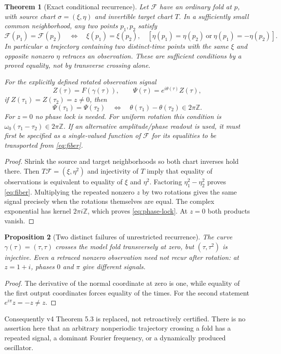 \documentclass[11pt,a4paper]{article}
\newtheorem{theorem}{Theorem}[section]
\newtheorem{proposition}[theorem]{Proposition}
\theoremstyle{definition}\newtheorem{definition}[theorem]{Definition}
\theoremstyle{remark}\newtheorem{remark}[theorem]{Remark}
\newcommand{\Map}{\mathcal F}\newcommand{\Pcore}{\mathcal P}
\begin{document}
\begin{theorem}[Exact conditional recurrence]\label{thm:recurrence}
Let $\Map$ have an ordinary fold at $p$, with source chart
$\sigma=(\xi,\eta)$ and invertible target chart $T$. In a sufficiently
small common neighborhood, any two points $p_1,p_2$ satisfy
\begin{equation}\label{eq:fiber}
 \Map(p_1)=\Map(p_2)\quad\Longleftrightarrow\quad
 \xi(p_1)=\xi(p_2),\quad
 [\eta(p_1)=\eta(p_2)\ \text{or}\ \eta(p_1)=-\eta(p_2)].
\end{equation}
In particular a trajectory containing two distinct-time points with
the same $\xi$ and opposite nonzero $\eta$ retraces an observation.
These are sufficient conditions by a proved equality, not by transverse
crossing alone.

For the explicitly defined rotated observation signal
\[
 Z(\tau)=F(\gamma(\tau)),\qquad
 \Psi(\tau)=e^{i\theta(\tau)}Z(\tau),
\]
if $Z(\tau_1)=Z(\tau_2)=z\ne0$, then
\begin{equation}\label{eq:phase-lock}
 \Psi(\tau_1)=\Psi(\tau_2)
 \quad\Longleftrightarrow\quad
 \theta(\tau_1)-\theta(\tau_2)\in2\pi\mathbb Z.
\end{equation}
For $z=0$ no phase lock is needed. For uniform rotation this condition is
$\omega_0(\tau_1-\tau_2)\in2\pi\mathbb Z$.
If an alternative amplitude/phase readout is used, it must first be
specified as a single-valued function of $\Map$ for its equalities to
be transported from \eqref{eq:fiber}.
\end{theorem}
\begin{proof}
Shrink the source and target neighborhoods so both chart inverses
hold there. Then $T\Map= (\xi,\eta^2)$ and injectivity of $T$ imply
that equality of observations is equivalent to equality of $\xi$ and
$\eta^2$. Factoring $\eta_1^2-\eta_2^2$ proves \eqref{eq:fiber}.
Multiplying the repeated nonzero $z$ by two rotations gives the same
signal precisely when the rotations themselves are equal. The complex
exponential has kernel $2\pi i\mathbb Z$, which proves
\eqref{eq:phase-lock}. At $z=0$ both products vanish.
\end{proof}

\begin{proposition}[Two distinct failures of unrestricted recurrence]\label{prop:counterexamples}
The curve $\gamma(\tau)=(\tau,\tau)$ crosses the model fold transversely
at zero, but $(\tau,\tau^2)$ is injective. Even a retraced nonzero
observation need not recur after rotation: at $z=1+i$, phases $0$ and
$\pi$ give different signals.
\end{proposition}
\begin{proof}
The derivative of the normal coordinate at zero is one, while equality
of the first output coordinates forces equality of the times.
For the second statement $e^{i\pi}z=-z\ne z$.
\end{proof}
Consequently v4 Theorem 5.3 is replaced, not retroactively certified.
There is no assertion here that an arbitrary nonperiodic trajectory
crossing a fold has a repeated signal, a dominant Fourier frequency,
or a dynamically produced oscillator.
\end{document}
